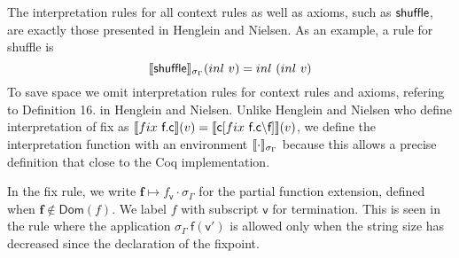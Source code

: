 \documentclass[a4paper,UKenglish,cleveref, autoref, thm-restate]{lipics-v2021}
\begin{document}
The interpretation rules for all context rules as well as axioms, such as $\textsf{shuffle}$, are exactly those presented in Henglein and Nielsen. As an example, a rule for shuffle is 
\[\interpsig{shuffle}{inl~v}{inl~(inl~v)} \]
To save space we omit interpretation rules for context rules and axioms, refering to Definition 16. in Henglein and Nielsen. Unlike Henglein and Nielsen who define interpretation of fix as $\interp{\fix ~ \dslcom{f.c}}(\mathsf{v})=\interp{\dslcom{c}[\fix~\dslcom{f.c} \backslash \dslcom{f}]}(\mathsf{v})$, we define the interpretation function with an environment $\llbracket \cdot \rrbracket_{\sigma_{\Gamma}}$ because this allows a precise definition that close to the Coq implementation.

In the fix rule, we write $\mathbf{f} \mapsto f_{\mathsf{v}} \cdot \sigma_{\Gamma}$ for the partial function extension, defined when $\mathbf{f} \notin \mathsf{Dom}(f)$. We label $f$ with subscript $\mathsf{v}$ for termination. This is seen in the rule where the application $\sigma_{\Gamma}~\mathsf{f}(\mathsf{v'})$ is allowed only when the string size has decreased since the declaration of the fixpoint.
\end{document}
